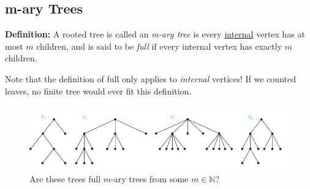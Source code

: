 \documentclass[a4paper,10pt]{report}
\begin{document}
\subsection{m-ary Trees}
\textbf{Definition: } A rooted tree is called an \textit{m-ary tree} is every \underline{internal} vertex has at most $m$ children, and is said to be \textit{full} if every internal vertex has exactly $m$ children.

Note that the definition of full only applies to \textit{internal} vertices! If we counted leaves, no finite tree would ever fit this definition.

\begin{figure}[h!]
	\begin{centering}
	\begin{center}
	\includegraphics[width=\linewidth]{./m_ary_exercise.png}
	\caption{Are these trees full $m$-ary trees from some $m\in\mathbb{N}$?}
	\label{fig:??????}
	\end{center}
	\par\end{centering}
\end{figure}
\end{document}
